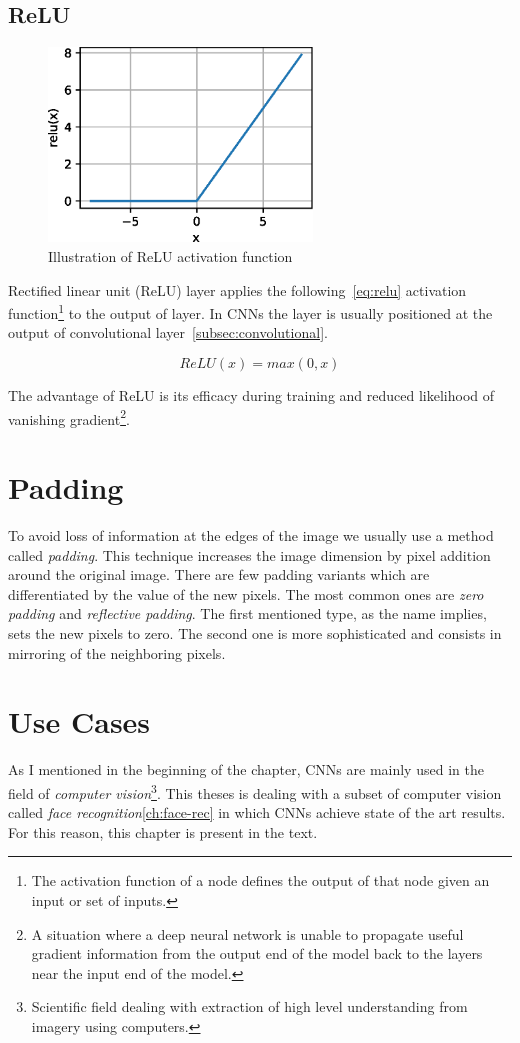 \subsection{ReLU}\label{subsec:relu}

\begin{figure}
    \label{fig:relu}
    \includegraphics[width=7cm]{images/cnn/relu.eps}
    \caption{Illustration of ReLU activation function~\cite{ReLU}}
\end{figure}

Rectified linear unit (ReLU) layer applies the following~\ref{eq:relu} activation function\footnote{The activation
function of a node defines the output of that node given an input or set of inputs.} to the output of layer.
In CNNs the layer is usually positioned at the output of convolutional layer~\ref{subsec:convolutional}.

\begin{equation}\label{eq:relu}
    ReLU(x) = max(0,x)
\end{equation}

The advantage of ReLU is its efficacy during training and reduced likelihood of vanishing
gradient\footnote{A situation where a deep neural network is unable to propagate useful gradient information from the
output end of the model back to the layers near the input end of the model.}.


\section{Padding}\label{sec:padding}
To avoid loss of information at the edges of the image we usually use a method called \textit{padding}.
This technique increases the image dimension by pixel addition around the original image.
There are few padding variants which are differentiated by the value of the new pixels.
The most common ones are \textit{zero padding} and \textit{reflective padding}.
The first mentioned type, as the name implies, sets the new pixels to zero.
The second one is more sophisticated and consists in mirroring of the neighboring pixels.

\section{Use Cases}\label{sec:use-cases}
As I mentioned in the beginning of the chapter, CNNs are mainly used in the field of
\textit{computer vision}\footnote{Scientific field dealing with extraction of high level understanding from imagery
using computers.}.
This theses is dealing with a subset of computer vision called \textit{face recognition}\ref{ch:face-rec} in which CNNs
achieve state of the art results.
For this reason, this chapter is present in the text.
